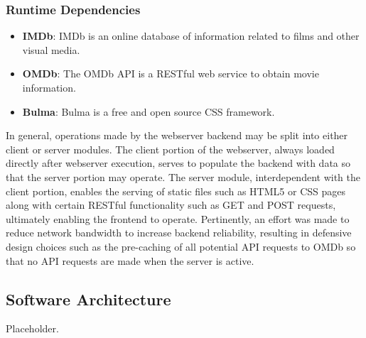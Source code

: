 \documentclass{article}
\begin{document}
\subsubsection*{Runtime Dependencies}
\begin{itemize}
\item \textbf{IMDb}: IMDb is an online database of information related to films
and other visual media.
\item \textbf{OMDb}: The OMDb API is a RESTful web service to obtain movie
information.
\item \textbf{Bulma}: Bulma is a free and open source CSS framework.
\end{itemize}
In general, operations made by the webserver backend may be split into either 
client or server modules. The client portion of the webserver, always loaded
directly after webserver execution, serves to populate the backend with data
so that the server portion may operate. The server module, interdependent with
the client portion, enables the serving of static files such as HTML5 or CSS
pages along with certain RESTful functionality such as GET and POST requests,
ultimately enabling the frontend to operate. Pertinently, an effort was made to
reduce network bandwidth to increase backend reliability, resulting in defensive
design choices such as the pre-caching of all potential API requests to OMDb so
that no API requests are made when the server is active.
\subsection{Software Architecture}
Placeholder.
\end{document}
